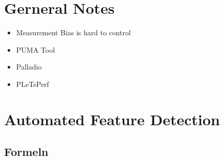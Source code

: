 \documentclass{article}
\begin{document}
	
	\tableofcontents 
	\newpage
	 \section{Gerneral Notes}
	 \begin{itemize}
	 	\item	Measurement Bias is hard to control \cite{PredictingPerformanceAutmatedFeatureDetectionSiegmund2012}
	 	\item PUMA Tool
	 	\item Palladio
	 	\item PLeTsPerf
	 \end{itemize}
	
	\section{Automated Feature Detection}
	\subsection{Formeln\cite{PredictingPerformanceAutmatedFeatureDetectionSiegmund2012}}
	
\end{document}
